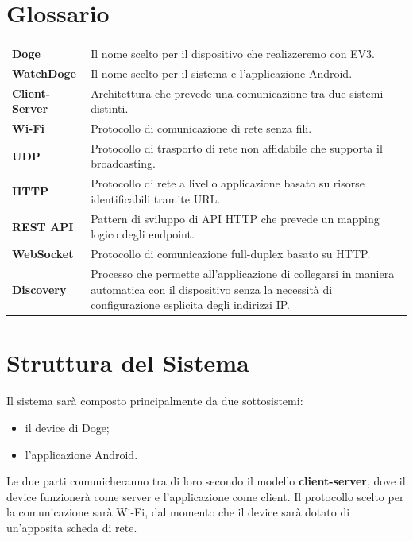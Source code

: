\documentclass{article}
\begin{document}
\section{Glossario}

\begin{center}
\centering
\def\arraystretch{1.5}
\begin{tabular}{l p{12cm}}
\textbf{Doge} & Il nome scelto per il dispositivo che realizzeremo con EV3. \\
\textbf{WatchDoge} & Il nome scelto per il sistema e l'applicazione Android. \\
\textbf{Client-Server} & Architettura che prevede una comunicazione tra due sistemi distinti. \\
\textbf{Wi-Fi} & Protocollo di comunicazione di rete senza fili. \\
\textbf{UDP} & Protocollo di trasporto di rete non affidabile che supporta il broadcasting. \\
\textbf{HTTP} & Protocollo di rete a livello applicazione basato su risorse identificabili tramite URL. \\
\textbf{REST API} & Pattern di sviluppo di API HTTP che prevede un mapping logico degli endpoint. \\
\textbf{WebSocket} & Protocollo di comunicazione full-duplex basato su HTTP. \\
\textbf{Discovery} & Processo che permette all'applicazione di collegarsi in maniera automatica con il dispositivo senza la necessità di configurazione esplicita degli indirizzi IP. \\
\end{tabular}
\end{center}

\section{Struttura del Sistema}

Il sistema sarà composto principalmente da due sottosistemi:

\begin{itemize}
    \item il device di Doge;
    \item l'applicazione Android.
\end{itemize}

Le due parti comunicheranno tra di loro secondo il modello \textbf{client-server}, dove il device funzionerà come server e l'applicazione come client. Il protocollo scelto per la comunicazione sarà Wi-Fi, dal momento che il device sarà dotato di un'apposita scheda di rete.
\end{document}
